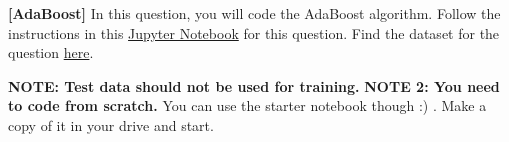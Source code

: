 \documentclass[addpoints,12pt,solution]{exam}
\begin{document}
\begin{questions}


\question \textbf{[AdaBoost]} In this question, you will code  the AdaBoost algorithm. Follow the instructions in this \href{https://drive.google.com/file/d/1EXxgwze28jnrkafl_7F99AJ7uD9gdIMI/view?usp=sharing}{Jupyter Notebook} for this question. Find the dataset for the question \href{https://drive.google.com/drive/folders/1V52vjD8PHoLikP8sfAPi7hWABRwJ_7HQ?usp=sharing}{here}.

\textbf{NOTE: Test data should not be used for training.}
\smallbreak \textbf{NOTE 2: You need to code from scratch. } You can use the starter notebook though :) . Make a copy of it in your drive and start.
\end{questions}
\end{document}
